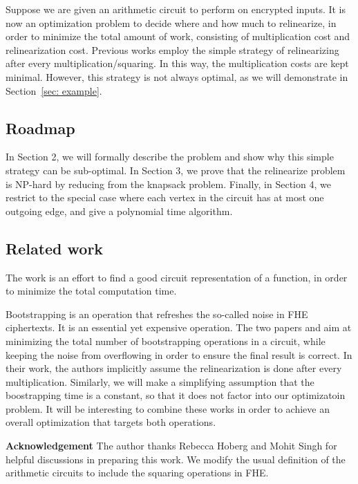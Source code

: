 \documentclass[11pt]{article} %
\theoremstyle{plain}
\theoremstyle{definition}
\begin{document}
Suppose we are given an arithmetic circuit to perform on encrypted inputs. It is now an optimization problem to decide where and how much to relinearize, in order to minimize the total amount of work, consisting of multiplication cost and relinearization cost. Previous works employ the simple strategy of relinearizing after every multiplication/squaring. In this way, the multiplication costs are kept minimal. However, this strategy is not always optimal, as we will demonstrate in Section~\ref{sec: example}. 


\subsection{Roadmap}
In Section 2, we will formally describe the problem and show why this simple strategy can be sub-optimal. In Section 3, we prove that the relinearize problem is NP-hard by reducing from the knapsack problem. Finally, in Section 4, we restrict to the special case where each vertex in the circuit has at most one outgoing edge, and give a polynomial time algorithm. 

\subsection{Related work}

The work \cite{carpov2015armadillo} is an effort to 
find a good circuit representation of a function, in order to minimize the total computation time. 

Bootstrapping is an operation that refreshes the so-called noise in FHE ciphertexts. It is an essential yet expensive operation. The two papers \cite{lepoint2013minimal} and \cite{benhamouda2017optimization} aim at minimizing the total number of bootstrapping operations in a circuit, while keeping the noise from overflowing in order to ensure the final result is correct. In their work, the authors implicitly assume the relinearization is done after every multiplication. Similarly, we will make a simplifying assumption that the boostrapping time is a constant, so that it does not factor into our optimizatoin problem. It will be interesting to combine these works in order to achieve an overall optimization that targets both operations. 


{\bf Acknowledgement} The author thanks Rebecca Hoberg and Mohit Singh for helpful discussions in preparing this work. We modify the usual definition of the arithmetic circuits to include the squaring operations in FHE.
\end{document}
